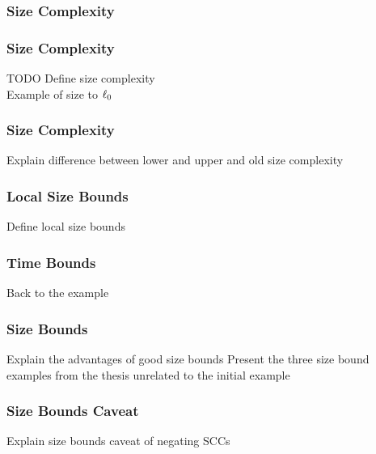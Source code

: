 \documentclass{beamer}
\begin{document}
\begin{frame}
  \frametitle{Size Complexity}
  \begin{figure}
    \centering
  \end{figure}
\end{frame}

\begin{frame}
  \frametitle{Size Complexity}
  \begin{block}{TODO}
    Define size complexity \\
    Example of size to $\ell_0$
  \end{block}
\end{frame}

\begin{frame}
  \frametitle{Size Complexity}
  Explain difference between lower and upper and old size complexity
\end{frame}

\begin{frame}
  \frametitle{Local Size Bounds}
  Define local size bounds
\end{frame}

\begin{frame}
  \frametitle{Time Bounds}
  Back to the example
\end{frame}

\begin{frame}
  \frametitle{Size Bounds}
  Explain the advantages of good size bounds
  Present the three size bound examples from the thesis unrelated to the initial example
\end{frame}

\begin{frame}
  \frametitle{Size Bounds Caveat}
  Explain size bounds caveat of negating SCCs
\end{frame}
\end{document}
